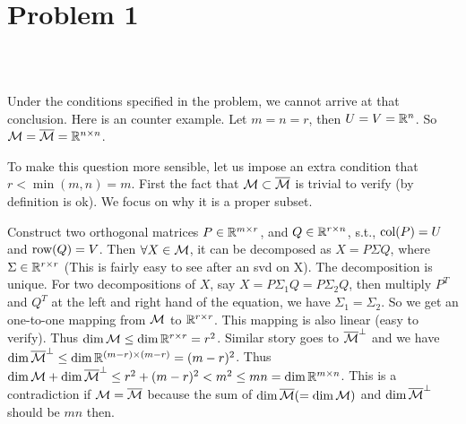 \section{Problem 1}~\label{sec:prob1}

\subsection{} %

Under the conditions specified in the problem,
we cannot arrive at that conclusion.
Here is an counter example.
Let $m=n=r$, then $U=V={\mathbb{R}}^n$.
So ${\mathcal{M}}={\overline{{\mathcal{M}}}}={\mathbb{R}}^{n\times n}$.

To make this question more sensible,
let us impose an extra condition that
$r<\min(m,n)=m$.
First the fact that ${\mathcal{M}} \subset {\overline{{\mathcal{M}}}}$ is trivial to verify
(by definition is ok).
We focus on why it is a proper subset.

Construct two orthogonal matrices $P\in{\mathbb{R}}^{m\times r}$,
and $Q\in {\mathbb{R}}^{r\times n}$, s.t.,
${\text{col}}(P)=U$ and ${\text{row}}(Q)=V$.
Then $\forall X\in{\mathcal{M}}$, it can be decomposed as
$X=P\Sigma Q$, where $\Sigma\in{\mathbb{R}}^{r\times r}$
(This is fairly easy to see after an svd on X).
The decomposition is unique.
For two decompositions of $X$,
say $X=P\Sigma_1 Q=P\Sigma_2 Q$,
then multiply $P^T$ and $Q^T$ at the left and right hand of the equation,
we have $\Sigma_1=\Sigma_2$.
So we get an one-to-one mapping from ${\mathcal{M}}$ to ${\mathbb{R}}^{r\times r}$.
This mapping is also linear (easy to verify).
Thus $\dim {\mathcal{M}} \le \dim {\mathbb{R}}^{r\times r} = r^2$.
Similar story goes to ${\overline{{\mathcal{M}}}}^\perp$ and we have
$\dim {\overline{{\mathcal{M}}}}^\perp \le \dim {\mathbb{R}}^{(m-r)\times(m-r)} = (m-r)^2$.
Thus $\dim {\mathcal{M}} + \dim {\overline{{\mathcal{M}}}}^\perp \le r^2 + (m-r)^2 < m^2 \le mn = \dim {\mathbb{R}}^{m\times n}$.
This is a contradiction if ${\mathcal{M}}={\overline{{\mathcal{M}}}}$ because
the sum of $\dim {\overline{{\mathcal{M}}}}(=\dim {\mathcal{M}})$ and $\dim {\overline{{\mathcal{M}}}}^\perp$ should be $mn$ then.

\subsection{} %
